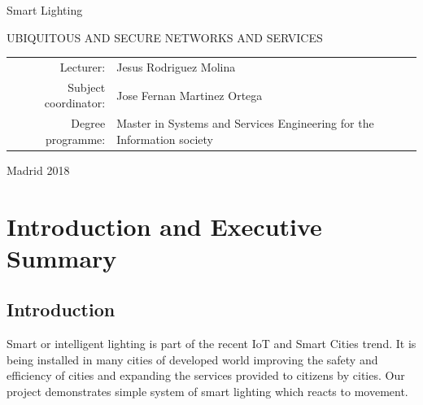 \documentclass[UKenglish,10pt,a4paper]{report}
\let\openright=\clearpage
\begin{document}
\begin{titlepage}
\begin{center}
\vspace{10mm}

{\LARGE\bfseries } Smart Lighting

\vfill

UBIQUITOUS AND SECURE NETWORKS AND SERVICES

\vfill

\begin{tabular}{rl}

Lecturer: & Jesus Rodriguez Molina  \\
\noalign{\vspace{2mm}}
Subject coordinator: & Jose Fernan Martinez Ortega \\
\noalign{\vspace{2mm}}
Degree programme: & Master in Systems and Services Engineering for the Information society \\
\end{tabular}

\vfill

Madrid 2018

\end{center}
\end{titlepage}
\newpage



\openright

\noindent






\openright
\pagestyle{plain}
\setcounter{page}{1}
\tableofcontents


\chapter{Introduction and Executive Summary}
\section{Introduction}
Smart or intelligent lighting is part of the recent IoT and Smart Cities trend. It is being installed in many cities of developed world improving the safety and efficiency of cities and expanding the services provided to citizens by cities. Our project demonstrates simple system of smart lighting which reacts to movement. 
\end{document}
